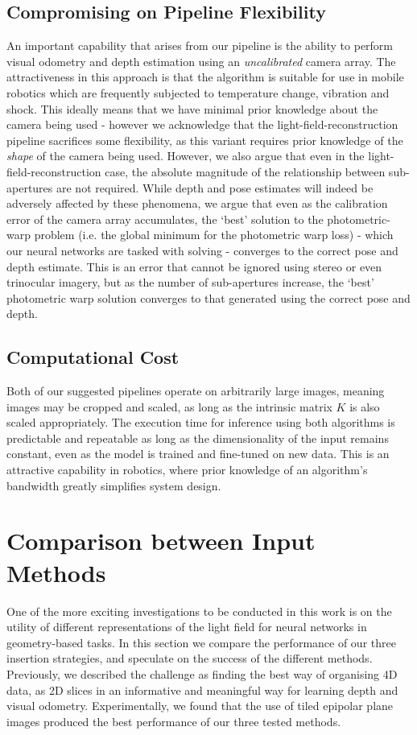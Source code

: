\subsection{Compromising on Pipeline Flexibility}
An important capability that arises from our pipeline is the ability to perform visual odometry and depth estimation using an \textit{uncalibrated} camera array. The attractiveness in this approach is that the algorithm is suitable for use in mobile robotics which are frequently subjected to temperature change, vibration and shock. This ideally means that we have minimal prior knowledge about the camera being used - however we acknowledge that the light-field-reconstruction pipeline sacrifices some flexibility, as this variant requires prior knowledge of the \textit{shape} of the camera being used. However, we also argue that even in the light-field-reconstruction case, the absolute magnitude of the relationship between sub-apertures are not required. While depth and pose estimates will indeed be adversely affected by these phenomena, we argue that even as the calibration error of the camera array accumulates, the `best' solution to the photometric-warp problem (i.e. the global minimum for the photometric warp loss) - which our neural networks are tasked with solving - converges to the correct pose and depth estimate. This is an error that cannot be ignored using stereo or even trinocular imagery, but as the number of sub-apertures increase, the `best' photometric warp solution converges to that generated using the correct pose and depth. 

\subsection{Computational Cost}
Both of our suggested pipelines operate on arbitrarily large images, meaning images may be cropped and scaled, as long as the intrinsic matrix $K$ is also scaled appropriately. The execution time for inference using both algorithms is predictable and repeatable as long as the dimensionality of the input remains constant, even as the model is trained and fine-tuned on new data. This is an attractive capability in robotics, where prior knowledge of an algorithm's bandwidth greatly simplifies system design. 


\section{Comparison between Input Methods}
One of the more exciting investigations to be conducted in this work is on the utility of different representations of the light field for neural networks in geometry-based tasks. In this section we compare the performance of our three insertion strategies, and speculate on the success of the different methods. Previously, we described the challenge as finding the best way of organising 4D data, as 2D slices in an informative and meaningful way for learning depth and visual odometry. Experimentally, we found that the use of tiled epipolar plane images produced the best performance of our three tested methods.

